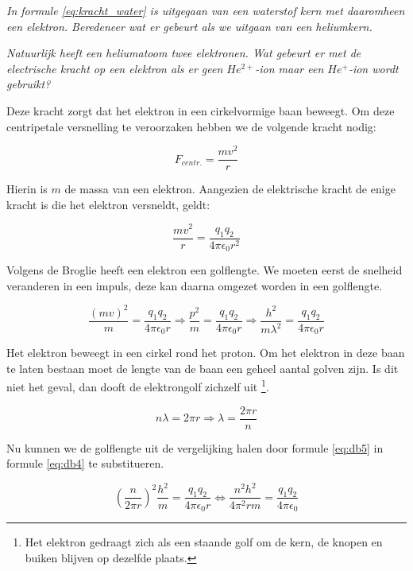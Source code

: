 \emph{In formule \ref{eq:kracht_water} is uitgegaan van een waterstof
kern met daaromheen een elektron. Beredeneer wat er gebeurt als we
uitgaan van een heliumkern. }

\emph{Natuurlijk heeft een heliumatoom twee elektronen. Wat gebeurt
er met de electrische kracht op een elektron als er geen $He^{2+}$-ion
maar een $He^{+}$-ion wordt gebruikt? }

Deze kracht zorgt dat het elektron in een cirkelvormige baan beweegt.
Om deze centripetale versnelling te veroorzaken hebben we de volgende
kracht nodig:

\begin{equation}
F_{centr.}=\frac{mv^{2}}{r}
\end{equation}


Hierin is $m$ de massa van een elektron. Aangezien de elektrische
kracht de enige kracht is die het elektron versneldt, geldt:

\begin{equation}
\frac{mv^{2}}{r}=\frac{q_{1}q_{2}}{4\pi\epsilon_{0}r^{2}}
\end{equation}


Volgens de Broglie heeft een elektron een golflengte. We moeten eerst
de snelheid veranderen in een impuls, deze kan daarna omgezet worden
in een golflengte.

\begin{equation} \label{eq:db4}
\frac{\left(mv\right)^{2}}{m}=\frac{q_{1}q_{2}}{4\pi\epsilon_{0}r}
\Rightarrow\frac{p^{2}}{m}=\frac{q_{1}q_{2}}{4\pi\epsilon_{0}r}
\Rightarrow\frac{h^{2}}{m\lambda^{2}}=\frac{q_{1}q_{2}}{4\pi\epsilon_{0}r}
\end{equation}


Het elektron beweegt in een cirkel rond het proton. Om het elektron in
deze baan te laten bestaan moet de lengte van de baan een geheel aantal
golven zijn. Is dit niet het geval, dan dooft de elektrongolf zichzelf
uit \footnote{Het elektron gedraagt zich als een staande golf om de
kern, de knopen en buiken blijven op dezelfde plaats.}.

\begin{equation} \label{eq:db5}
n\lambda=2\pi r\Rightarrow\lambda=\frac{2\pi r}{n}
\end{equation}


Nu kunnen we de golflengte uit de vergelijking halen door formule
\ref{eq:db5} in formule \ref{eq:db4} te substitueren.

\begin{equation}
\left(\frac{n}{2\pi r}\right)^{2}\frac{h^{2}}{m}=\frac{q_{1}q_{2}}{4\pi\epsilon_{0}r}
\Leftrightarrow\frac{n^{2}h^{2}}{4\pi^{2}rm}=\frac{q_{1}q_{2}}{4\pi\epsilon_{0}}
\end{equation}


